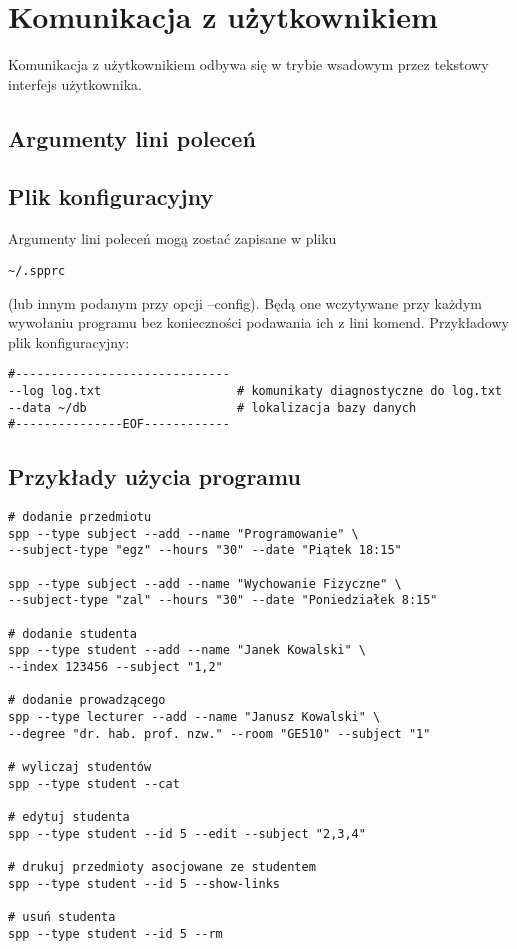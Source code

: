 \documentclass[bibtotocnumbered, headsepline,normalheadings,12pt,polish]{scrreprt}
\begin{document}
\section{Komunikacja z użytkownikiem}
Komunikacja z użytkownikiem odbywa się w trybie wsadowym przez tekstowy interfejs użytkownika.

\subsection{Argumenty lini poleceń}
\pagebreak
{}
\large

\subsection{Plik konfiguracyjny}
Argumenty lini poleceń mogą zostać zapisane w pliku \begin{verbatim}~/.spprc\end{verbatim} 
(lub innym podanym przy opcji --config). Będą one wczytywane przy każdym wywołaniu programu bez konieczności podawania ich z lini komend. Przykładowy plik konfiguracyjny:
\normalsize
\begin{verbatim}
#------------------------------
--log log.txt                   # komunikaty diagnostyczne do log.txt
--data ~/db                     # lokalizacja bazy danych
#---------------EOF------------
\end{verbatim}
\small
\subsection{Przykłady użycia programu}

\begin{verbatim}
# dodanie przedmiotu
spp --type subject --add --name "Programowanie" \
--subject-type "egz" --hours "30" --date "Piątek 18:15"

spp --type subject --add --name "Wychowanie Fizyczne" \
--subject-type "zal" --hours "30" --date "Poniedziałek 8:15"

# dodanie studenta
spp --type student --add --name "Janek Kowalski" \
--index 123456 --subject "1,2"

# dodanie prowadzącego
spp --type lecturer --add --name "Janusz Kowalski" \
--degree "dr. hab. prof. nzw." --room "GE510" --subject "1"

# wyliczaj studentów
spp --type student --cat

# edytuj studenta
spp --type student --id 5 --edit --subject "2,3,4"

# drukuj przedmioty asocjowane ze studentem
spp --type student --id 5 --show-links

# usuń studenta
spp --type student --id 5 --rm
\end{verbatim}
\large
\end{document}
